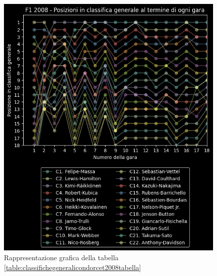 \documentclass[12pt,a4paper,openright,twoside]{book}
\begin{document}
\begin{figure}[H]
    \centering
     \includegraphics[scale=1.0]{figures/condorcetstandings2008.png}
     \caption{Rappresentazione grafica della tabella \ref{table:classifichegeneralicondorcet2008tabella} }
     \label{fig:classifichegeneralicondorcet2008figura}
 \end{figure}
\end{document}
